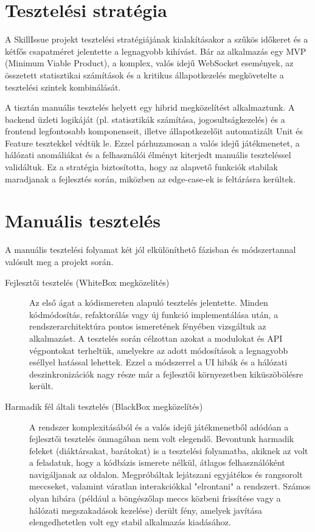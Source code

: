 \section{Tesztelési stratégia}

A SkillIssue projekt tesztelési stratégiájának kialakításakor a szűkös időkeret és a kétfős csapatméret jelentette a legnagyobb kihívást. Bár az alkalmazás egy MVP (Minimum Viable Product), a komplex, valós idejű WebSocket események, az összetett statisztikai számítások és a kritikus állapotkezelés megkövetelte a tesztelési szintek kombinálását. 

A tisztán manuális tesztelés helyett egy hibrid megközelítést alkalmaztunk. A backend üzleti logikáját (pl. statisztikák számítása, jogosultságkezelés) és a frontend legfontosabb komponenseit, illetve állapotkezelőit automatizált Unit és Feature tesztekkel védtük le. Ezzel párhuzamosan a valós idejű játékmenetet, a hálózati anomáliákat és a felhasználói élményt kiterjedt manuális teszteléssel validáltuk. Ez a stratégia biztosította, hogy az alapvető funkciók stabilak maradjanak a fejlesztés során, miközben az edge-case-ek is feltárásra kerültek.

\section{Manuális tesztelés}

A manuális tesztelési folyamat két jól elkülöníthető fázisban és módszertannal valósult meg a projekt során.

\begin{description}
    \item[Fejlesztői tesztelés (WhiteBox megközelítés)] Az első ágat a kódismereten alapuló tesztelés jelentette. Minden kódmódosítás, refaktorálás vagy új funkció implementálása után, a rendszerarchitektúra pontos ismeretének fényében vizsgáltuk az alkalmazást. A tesztelés során célzottan azokat a modulokat és API végpontokat terheltük, amelyekre az adott módosítások a legnagyobb eséllyel hatással lehettek. Ezzel a módszerrel a UI hibák és a hálózati deszinkronizációk nagy része már a fejlesztői környezetben kiküszöbölésre került.

    \item[Harmadik fél általi tesztelés (BlackBox megközelítés)] A rendszer komplexitásából és a valós idejű játékmenetből adódóan a fejlesztői tesztelés önmagában nem volt elegendő. Bevontunk harmadik feleket (diáktársakat, barátokat) is a tesztelési folyamatba, akiknek az volt a feladatuk, hogy a kódbázis ismerete nélkül, átlagos felhasználóként navigáljanak az oldalon. Megpróbáltak lejátszani egyjátékos és rangsorolt meccseket, valamint váratlan interakciókkal "elrontani" a rendszert. Számos olyan hibára (például a böngészőlap meccs közbeni frissítése vagy a hálózati megszakadások kezelése) derült fény, amelyek javítása elengedhetetlen volt egy stabil alkalmazás kiadásához.
\end{description}

